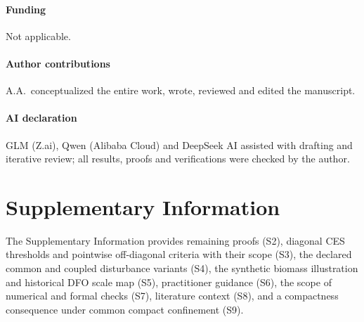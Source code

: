 \documentclass[preprint,11pt,authoryear]{elsarticle}
\theoremstyle{definition}
\theoremstyle{remark}
\begin{document}
\paragraph{Funding} Not applicable.
\paragraph{Author contributions} A.A.\ conceptualized the entire work, wrote, reviewed and edited the manuscript.
\paragraph{AI declaration} GLM (Z.ai), Qwen (Alibaba Cloud) and DeepSeek AI assisted with drafting and iterative review; all results, proofs and verifications were checked by the author.

\section*{Supplementary Information}
The Supplementary Information provides remaining proofs (S2), diagonal CES thresholds and pointwise off-diagonal criteria with their scope (S3), the declared common and coupled disturbance variants (S4), the synthetic biomass illustration and historical DFO scale map (S5), practitioner guidance (S6), the scope of numerical and formal checks (S7), literature context (S8), and a compactness consequence under common compact confinement (S9).
\end{document}

